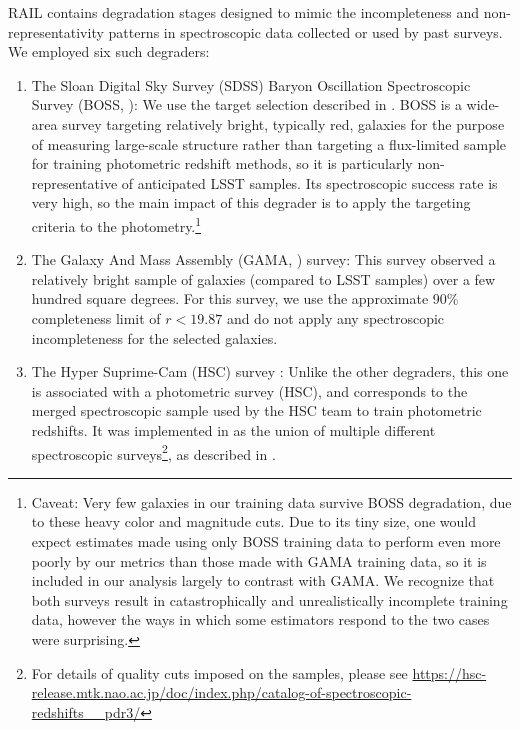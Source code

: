 \documentclass[fleqn,usenatbib,useAMS]{mnras}
\newcommand{\PersonalTag}[3]{{\color{#2}{$^{#1}$ [#3}]}}
\newcommand{\aim}[1]{\PersonalTag{Alex}{violet}{#1}}
\newcommand{\rachel}[1]{\PersonalTag{Rachel}{orange}{#1}}
\newcommand{\refresponse}[1]{{\color{black}{#1}}}
\begin{document}
RAIL contains degradation stages designed to mimic the incompleteness and non-representativity patterns in spectroscopic data collected or used by past surveys. 
We employed six such degraders: 
\begin{enumerate}
\item The Sloan Digital Sky Survey (SDSS) Baryon Oscillation Spectroscopic Survey (BOSS, \citealt{2013AJ....145...10D}): 
We use the target selection described in \cite{2016MNRAS.455.1553R}.  
BOSS is a wide-area survey targeting relatively bright, typically red, galaxies for the purpose of measuring large-scale structure rather than targeting a flux-limited sample for training photometric redshift methods, so it is particularly non-representative of anticipated LSST samples. 
Its spectroscopic success rate is very high, so the main impact of this degrader is to apply the targeting criteria to the photometry.\footnote{Caveat: Very few galaxies in our training data survive BOSS degradation, due to these heavy color and magnitude cuts. Due to its tiny size, one would expect estimates made using only BOSS training data to perform even more poorly by our metrics than those made with GAMA training data, so it is included in our analysis largely to contrast with GAMA. We recognize that both surveys result in catastrophically and unrealistically incomplete training data, however the ways in which some estimators respond to the two cases were surprising.} 
%
\refresponse{Since our degrader implements an approximate version of the BOSS target selection, we refer to this case hereafter as `pseudo-BOSS'. }
\item The Galaxy And Mass Assembly (GAMA, \citealt{2022MNRAS.513..439D}) survey: 
This survey observed a relatively bright sample of galaxies (compared to LSST samples) over a few hundred square degrees.  
For this survey, we use the approximate 90\% completeness limit of $r<19.87$ and do not apply any spectroscopic incompleteness for the selected galaxies. 
%
\item The Hyper Suprime-Cam (HSC) survey \citep{2018PASJ...70S...4A}:
    Unlike the other degraders, this one is associated with a photometric survey (HSC), and corresponds to the merged spectroscopic sample used by the HSC team to train photometric redshifts.  It was implemented in \citet{2023ApJ...950...49M} as the union of multiple different spectroscopic surveys\footnote{For details of quality cuts imposed on the samples, please see \url{https://hsc-release.mtk.nao.ac.jp/doc/index.php/catalog-of-spectroscopic-redshifts__pdr3/}}, as described in \citet{2020arXiv200301511N}.  

\end{enumerate}
\end{document}
